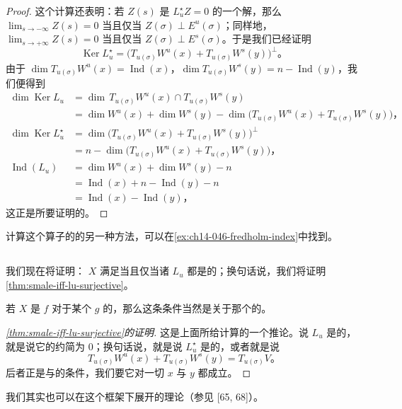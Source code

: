 \begin{proof}
这个计算还表明：若 $Z(s)$ 是 $L_{u}^{\star}Z=0$ 的一个解，那么 $\lim_{s\to-\infty}Z(s)=0$ 当且仅当 $Z(\sigma)\perp E^{u}(\sigma)$；同样地，$\lim_{s\to+\infty}Z(s)=0$ 当且仅当 $Z(\sigma)\perp E^{s}(\sigma)$。于是我们已经证明
\[ \operatorname{Ker}L_{u}^{\star}=\bigl(T_{u(\sigma)}W^{u}(x)+T_{u(\sigma)}W^{s}(y)\bigr)^{\perp}\text{。} \]
由于 $\dim T_{u(\sigma)}W^{u}(x)=\operatorname{Ind}(x)$，$\dim T_{u(\sigma)}W^{s}(y)=n-\operatorname{Ind}(y)$，我们便得到
\[
\begin{aligned}
\dim\operatorname{Ker}L_{u}
&=\dim\, T_{u(\sigma)}W^{u}(x)\cap T_{u(\sigma)}W^{s}(y)\\
&=\dim W^{u}(x)+\dim W^{s}(y)-\dim\bigl(T_{u(\sigma)}W^{u}(x)+T_{u(\sigma)}W^{s}(y)\bigr)\text{，}\\[4pt]
\dim\operatorname{Ker}L_{u}^{\star}
&=\dim\bigl(T_{u(\sigma)}W^{u}(x)+T_{u(\sigma)}W^{s}(y)\bigr)^{\perp}\\
&=n-\dim\bigl(T_{u(\sigma)}W^{u}(x)+T_{u(\sigma)}W^{s}(y)\bigr)\text{，}\\[4pt]
\operatorname{Ind}(L_{u})
&=\dim W^{u}(x)+\dim W^{s}(y)-n\\
&=\operatorname{Ind}(x)+n-\operatorname{Ind}(y)-n\\
&=\operatorname{Ind}(x)-\operatorname{Ind}(y)\text{，}
\end{aligned}
\]
这正是所要证明的。
\end{proof}

计算这个算子的\trIndex{}的另一种方法，可以在\cref{ex:ch14-046-fredholm-index}中找到。

\subsection{\trSmaleCondition}
\label{subsec:smale-condition-morse}

我们现在将证明：\trVectorField{} $X$ 满足\trSmaleCondition{}当且仅当诸 $L_{u}$ 都是\trSurjective{}的；换句话说，我们将证明\cref{thm:smale-iff-lu-surjective}。

\begin{remark}\label{thm:metric-dependence-smale}
若 $X$ 是 $f$ 对于某个\trMetric{} $g$ 的\trGradient，那么这条条件当然是关于那个\trMetric{}的。
\end{remark}

\begin{proof}[\cref{thm:smale-iff-lu-surjective}的证明]
这是上面所给计算的一个推论。说 $L_{u}$ 是\trSurjective{}的，就是说它的\trCokernel{}约简为 $0$；换句话说，就是说 $L_{u}^{\star}$ 是\trInjective{}的，或者就是说
\[ T_{u(\sigma)}W^{u}(x)+T_{u(\sigma)}W^{s}(y)=T_{u(\sigma)}V\text{。} \]
后者正是\trStableManifold{}与\trUnstableManifold{}的\trTransversality{}条件，我们要它对一切\trCriticalPoint{} $x$ 与 $y$ 都成立。
\end{proof}

我们其实也可以在这个框架下展开\trMorseComplex{}的理论（参见 [65, 68]）。



